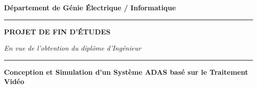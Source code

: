 \documentclass[12pt,a4paper,twoside]{report}
\begin{document}

\begin{titlepage}
\begin{center}

\vspace*{0.5cm}

\begin{minipage}{0.3\textwidth}
\centering
{}
\end{minipage}
\hfill
\begin{minipage}{0.3\textwidth}
\centering
{}
\end{minipage}
\hfill
\begin{minipage}{0.3\textwidth}
\centering
{}
\end{minipage}

\vspace{1.5cm}

{\Large \textbf{Département de Génie Électrique / Informatique}}

\vspace{0.5cm}

\rule{\textwidth}{1.5pt}

\vspace{1cm}

{\Huge \textbf{PROJET DE FIN D'ÉTUDES}}

\vspace{0.5cm}

{\Large \textit{En vue de l'obtention du diplôme d'Ingénieur}}

\vspace{1cm}

\rule{0.8\textwidth}{0.5pt}

\vspace{0.5cm}

{\LARGE \textcolor{stellantisblue}{\textbf{Conception et Simulation d'un Système ADAS basé sur le Traitement Vidéo}}}


\end{center}
\end{titlepage}
\end{document}
